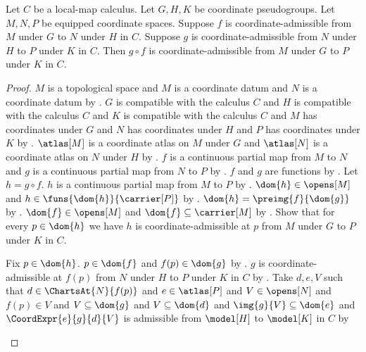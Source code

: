 \begin{theorem}\label{coordinate_admissible_composition}
    Let $C$ be a local-map calculus.
    Let $G,H,K$ be coordinate pseudogroups.
    Let $M,N,P$ be equipped coordinate spaces.
    Suppose $f$ is coordinate-admissible from $M$ under $G$ to $N$ under $H$ in $C$.
    Suppose $g$ is coordinate-admissible from $N$ under $H$ to $P$ under $K$ in $C$.
    Then $g\circ f$ is coordinate-admissible from $M$ under $G$ to $P$ under $K$ in $C$.
\end{theorem}
\begin{proof}
    $M$ is a topological space and $M$ is a coordinate datum and
        $N$ is a coordinate datum by .
    $G$ is compatible with the calculus $C$ and $H$ is compatible with the calculus $C$ and
        $K$ is compatible with the calculus $C$ and
        $M$ has coordinates under $G$ and $N$ has coordinates under $H$ and
        $P$ has coordinates under $K$ by .
    $\atlas[M]$ is a coordinate atlas on $M$ under $G$ and
        $\atlas[N]$ is a coordinate atlas on $N$ under $H$ by .
    $f$ is a continuous partial map from $M$ to $N$ and
        $g$ is a continuous partial map from $N$ to $P$ by .
    $f$ and $g$ are functions by .
    Let $h=g\circ f$.
    $h$ is a continuous partial map from $M$ to $P$ by .
    $\dom{h}\in\opens[M]$ and $h\in\funs{\dom{h}}{\carrier[P]}$ by
        .
    $\dom{h}=\preimg{f}{\dom{g}}$ by .
    $\dom{f}\in\opens[M]$ and $\dom{f}\subseteq\carrier[M]$ by
        .
    Show that for every $p\in\dom{h}$ we have
        $h$ is coordinate-admissible at $p$ from $M$ under $G$ to $P$ under $K$ in $C$.
    \begin{subproof}
        Fix $p\in\dom{h}$.
        $p\in\dom{f}$ and $f(p)\in\dom{g}$ by
            .
        $g$ is coordinate-admissible at $f(p)$ from $N$ under $H$ to $P$ under $K$ in $C$ by
            .
        Take $d,e,V$ such that $d\in\ChartsAt{N}{f(p)}$ and $e\in\atlas[P]$ and
            $V\in\opens[N]$ and $f(p)\in V$ and $V\subseteq\dom{g}$ and $V\subseteq\dom{d}$ and
            $\img{g}{V}\subseteq\dom{e}$ and
            $\CoordExpr{e}{g}{d}{V}$ is admissible from $\model[H]$ to $\model[K]$ in $C$ by

\end{subproof}
\end{proof}
